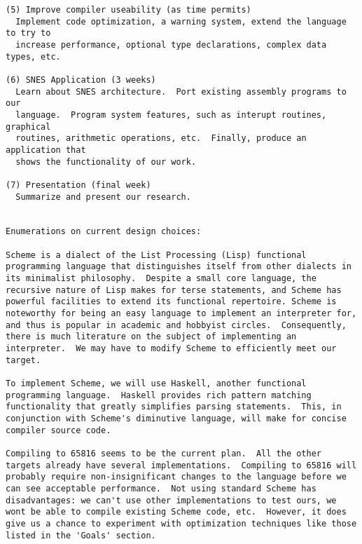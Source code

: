 \documentclass {article}
\begin{document}
\begin {verbatim}
(5) Improve compiler useability (as time permits)
  Implement code optimization, a warning system, extend the language to try to
  increase performance, optional type declarations, complex data types, etc.

(6) SNES Application (3 weeks)
  Learn about SNES architecture.  Port existing assembly programs to our
  language.  Program system features, such as interupt routines, graphical
  routines, arithmetic operations, etc.  Finally, produce an application that
  shows the functionality of our work.

(7) Presentation (final week)
  Summarize and present our research.


Enumerations on current design choices:

Scheme is a dialect of the List Processing (Lisp) functional
programming language that distinguishes itself from other dialects in
its minimalist philosophy.  Despite a small core language, the
recursive nature of Lisp makes for terse statements, and Scheme has
powerful facilities to extend its functional repertoire. Scheme is
noteworthy for being an easy language to implement an interpreter for,
and thus is popular in academic and hobbyist circles.  Consequently,
there is much literature on the subject of implementing an
interpreter.  We may have to modify Scheme to efficiently meet our
target.

To implement Scheme, we will use Haskell, another functional
programming language.  Haskell provides rich pattern matching
functionality that greatly simplifies parsing statements.  This, in
conjunction with Scheme's diminutive language, will make for concise
compiler source code.

Compiling to 65816 seems to be the current plan.  All the other
targets already have several implementations.  Compiling to 65816 will
probably require non-insignificant changes to the language before we
can see acceptable performance.  Not using standard Scheme has
disadvantages: we can't use other implementations to test ours, we
wont be able to compile existing Scheme code, etc.  However, it does
give us a chance to experiment with optimization techniques like those
listed in the 'Goals' section.

\end{verbatim}
\end{document}
